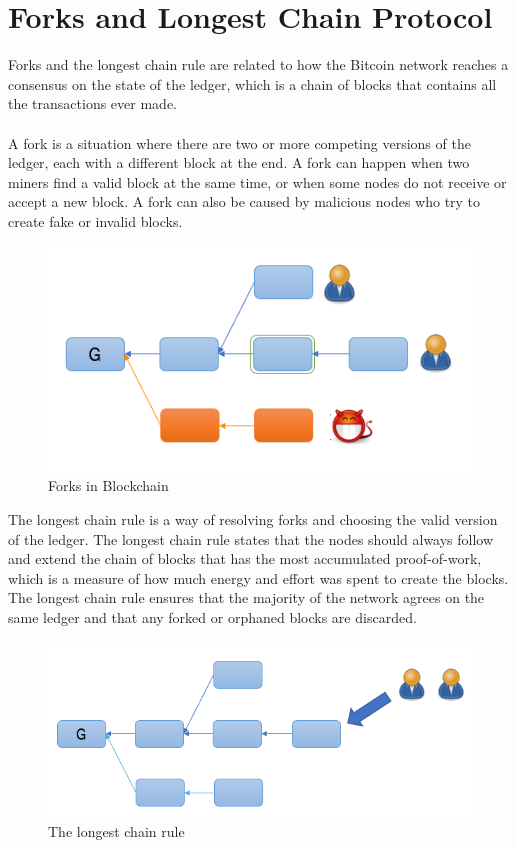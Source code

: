 \section{Forks and Longest Chain Protocol}
 Forks and the longest chain rule are related to how the Bitcoin network reaches a consensus on the state of the ledger, which is a chain of blocks that contains all the transactions ever made.\\\\
A fork is a situation where there are two or more competing versions of the ledger, each with a different block at the end. A fork can happen when two miners find a valid block at the same time, or when some nodes do not receive or accept a new block. A fork can also be caused by malicious nodes who try to create fake or invalid blocks.
\begin{center}
    \begin{figure}[h!]
        \centering
        \includegraphics[width=0.6\linewidth]{Fig/03/F1}
        \caption{Forks in Blockchain}
        \label{fig:f1}
    \end{figure}
\end{center}
The longest chain rule is a way of resolving forks and choosing the valid version of the ledger. The longest chain rule states that the nodes should always follow and extend the chain of blocks that has the most accumulated proof-of-work, which is a measure of how much energy and effort was spent to create the blocks. The longest chain rule ensures that the majority of the network agrees on the same ledger and that any forked or orphaned blocks are discarded.
\begin{center}
    \begin{figure}[h!]
        \centering
        \includegraphics[width=0.6\linewidth]{Fig/03/F2}
        \caption{The longest chain rule}
        \label{fig:f2}
    \end{figure}
\end{center}


